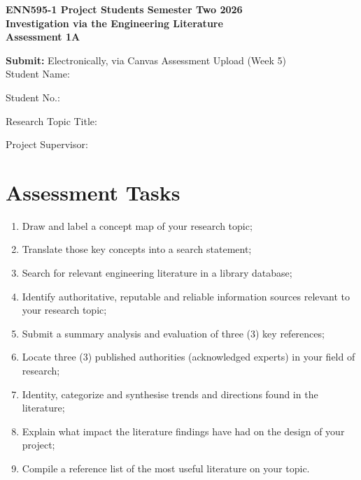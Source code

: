 \documentclass[12pt, a4paper]{article}
\begin{document}
\begin{center}
\textbf{\Large ENN595-1 Project Students \hfill Semester Two 2026} \\
\vspace{0.3cm}
\textbf{\Large Investigation via the Engineering Literature} \\
\vspace{0.3cm}
\textbf{\Large Assessment 1A} \\
\vspace{0.3cm}
\end{center}

\textbf{Submit:} Electronically, via Canvas Assessment Upload (Week 5) \\

\vspace{0.5cm}
\noindent Student Name: \hrulefill \\
\vspace{0.2cm}

\noindent Student No.: \hrulefill \\
\vspace{0.2cm}

\noindent Research Topic Title: \hrulefill \\
\vspace{0.2cm}

\noindent Project Supervisor: \hrulefill \\
\vspace{0.5cm}

\section*{Assessment Tasks}
\begin{enumerate}
    \item Draw and label a concept map of your research topic;
    \item Translate those key concepts into a search statement;
    \item Search for relevant engineering literature in a library database;
    \item Identify authoritative, reputable and reliable information sources relevant to your research topic;
    \item Submit a summary analysis and evaluation of three (3) key references;
    \item Locate three (3) published authorities (acknowledged experts) in your field of research;
    \item Identity, categorize and synthesise trends and directions found in the literature;
    \item Explain what impact the literature findings have had on the design of your project;
    \item Compile a reference list of the most useful literature on your topic.
\end{enumerate}
\end{document}
